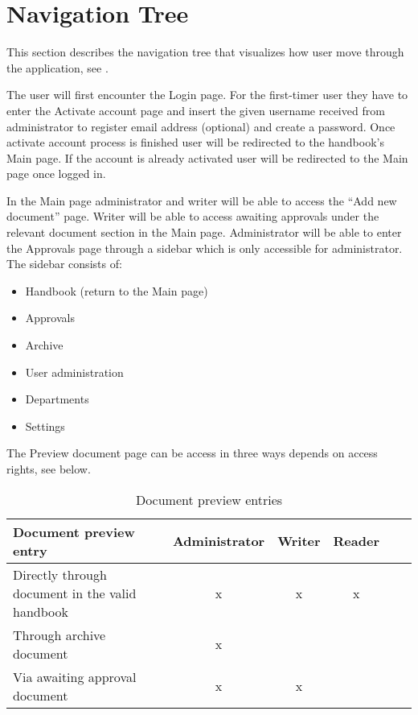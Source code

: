 \section{Navigation Tree}
This section describes the navigation tree that visualizes how user move through the application, see .


The user will first encounter the Login page.
For the first-timer user they have to enter the Activate account page and insert the given username received from administrator to register email address (optional) and create a password.
Once activate account process is finished user will be redirected to the handbook's Main page.
If the account is already activated user will be redirected to the Main page once logged in.

In the Main page administrator and writer will be able to access the ``Add new document'' page.
Writer will be able to access awaiting approvals under the relevant document section in the Main page.
Administrator will be able to enter the Approvals page through a sidebar which is only accessible for administrator.
The sidebar consists of:

\begin{itemize}
	\item Handbook (return to the Main page)
	\item Approvals
	\item Archive
	\item User administration
	\item Departments
	\item Settings
\end{itemize}

The Preview document page can be access in three ways depends on access rights, see  below.

\begin{table}[H]
	\begin{center}
	\begin{tabular}{| m{20em} | c | c | c | c | c |}
		\hline
		Document preview entry & Administrator & Writer & Reader \\
		\hline
		 Directly through document in the valid handbook & x  & x & x\\
		\hline
		 Through archive document  & x &  & \\
		\hline
		 Via awaiting approval document & x & x &  \\
		\hline
	\end{tabular}
	\end{center}
	\caption{Document preview entries}\label{tab:docPreviewEntries}
\end{table}


